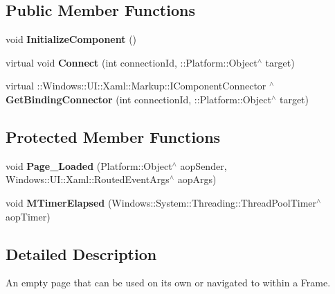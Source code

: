 \subsection*{Public Member Functions}
\begin{DoxyCompactItemize}
\item 
\mbox{\label{class_thermostat_1_1_main_page_ae9613bb5ad8c05464cb4786b9707f820}} 
void {\bfseries Initialize\+Component} ()
\item 
\mbox{\label{class_thermostat_1_1_main_page_a2f3855785b4919891ed16dc79f1a7ba8}} 
virtual void {\bfseries Connect} (int connection\+Id, \+::Platform\+::\+Object$^\wedge$ target)
\item 
\mbox{\label{class_thermostat_1_1_main_page_ab3268e3a8be780fc55e3ed2856f2e6d4}} 
virtual \+::Windows\+::\+U\+I\+::\+Xaml\+::\+Markup\+::\+I\+Component\+Connector $^\wedge$ {\bfseries Get\+Binding\+Connector} (int connection\+Id, \+::Platform\+::\+Object$^\wedge$ target)
\end{DoxyCompactItemize}
\subsection*{Protected Member Functions}
\begin{DoxyCompactItemize}
\item 
\mbox{\label{class_thermostat_1_1_main_page_ab3aa395384bce595509a9926d4d89cab}} 
void {\bfseries Page\+\_\+\+Loaded} (Platform\+::\+Object$^\wedge$ aop\+Sender, Windows\+::\+U\+I\+::\+Xaml\+::\+Routed\+Event\+Args$^\wedge$ aop\+Args)
\item 
\mbox{\label{class_thermostat_1_1_main_page_a790bf7e5e64ba6af4bb5fd2e1d527f64}} 
void {\bfseries M\+Timer\+Elapsed} (Windows\+::\+System\+::\+Threading\+::\+Thread\+Pool\+Timer$^\wedge$ aop\+Timer)
\end{DoxyCompactItemize}


\subsection{Detailed Description}
An empty page that can be used on its own or navigated to within a Frame. 



